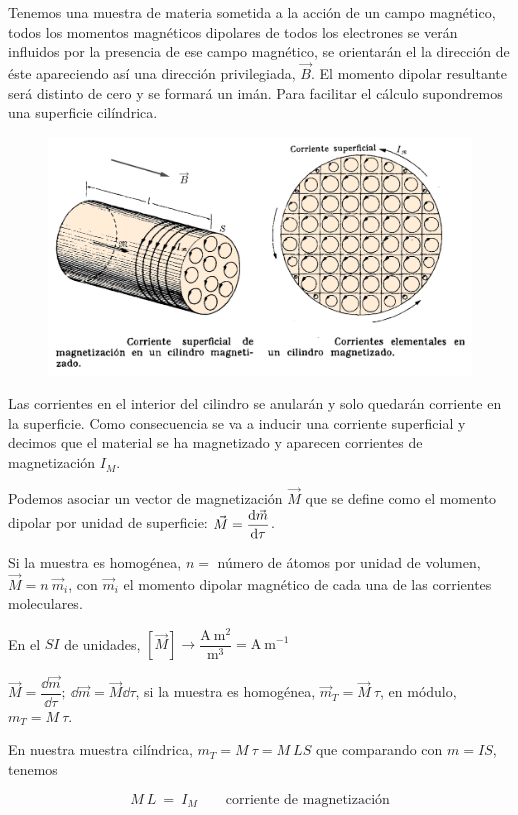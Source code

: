 Tenemos una muestra de materia sometida a la acción de un campo magnético, todos los momentos magnéticos dipolares de todos los electrones se verán influidos por la presencia de ese campo magnético, se orientarán el la dirección de éste apareciendo así una dirección privilegiada, $\vec B$. El momento dipolar resultante será distinto de cero y se formará un imán. Para facilitar el cálculo supondremos una superficie cilíndrica.

\begin{figure}[H]
	\centering
	\includegraphics[width=.7\textwidth]{imagenes/imagenes27/T27IM09.png}
\end{figure}	

Las corrientes en el interior del cilindro se anularán y solo quedarán  corriente en la superficie.
Como consecuencia se va a inducir una corriente superficial y decimos que el material se ha magnetizado y aparecen corrientes de magnetización  $I_M$.

Podemos asociar un vector de magnetización $\vec M$ que se define como el momento dipolar por unidad de superficie: $\displaystyle \vec M=\dv{\vec m}{\tau}$.

Si la muestra es homogénea, $n=$ número de átomos por unidad de volumen, $\vec M = n\ \vec m_i$, con $\vec m_i$ el momento dipolar magnético de cada una de las corrientes moleculares.

En el $SI$ de unidades, $[\vec M] \to \dfrac { \mathrm{A} \ \mathrm{m}^2 } {\mathrm {m}^3} = \mathrm{A\ m}^{-1}$

$\vec M = \dfrac{\dd \vec m}{\dd \tau}; \ \dd \vec m = \vec M \dd \tau$, si la muestra es homogénea, $\vec m_T=\vec M \ \tau$, en módulo,  $ m_T=M \ \tau$.

En nuestra muestra cilíndrica, $ m_T=M \ \tau = M\ LS$ que comparando con $m=IS$, tenemos

\begin{equation}
M\ L \ = \ I_M \qquad \text{corriente de magnetización} 	
\end{equation}


